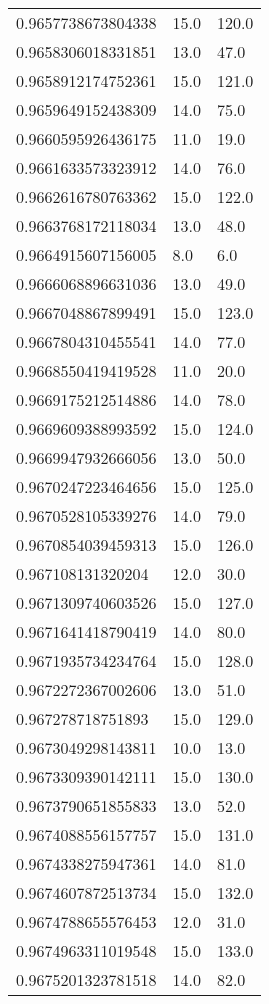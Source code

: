 \begin{center}
\begin{supertabular}[H]{p{0.30\textwidth}p{0.05\textwidth}p{0.05\textwidth}}
0.9657738673804338 & 15.0 & 120.0 \\ 
0.9658306018331851 & 13.0 & 47.0 \\ 
0.9658912174752361 & 15.0 & 121.0 \\ 
0.9659649152438309 & 14.0 & 75.0 \\ 
0.9660595926436175 & 11.0 & 19.0 \\ 
0.9661633573323912 & 14.0 & 76.0 \\ 
0.9662616780763362 & 15.0 & 122.0 \\ 
0.9663768172118034 & 13.0 & 48.0 \\ 
0.9664915607156005 & 8.0 & 6.0 \\ 
0.9666068896631036 & 13.0 & 49.0 \\ 
0.9667048867899491 & 15.0 & 123.0 \\ 
0.9667804310455541 & 14.0 & 77.0 \\ 
0.9668550419419528 & 11.0 & 20.0 \\ 
0.9669175212514886 & 14.0 & 78.0 \\ 
0.9669609388993592 & 15.0 & 124.0 \\ 
0.9669947932666056 & 13.0 & 50.0 \\ 
0.9670247223464656 & 15.0 & 125.0 \\ 
0.9670528105339276 & 14.0 & 79.0 \\ 
0.9670854039459313 & 15.0 & 126.0 \\ 
0.967108131320204 & 12.0 & 30.0 \\ 
0.9671309740603526 & 15.0 & 127.0 \\ 
0.9671641418790419 & 14.0 & 80.0 \\ 
0.9671935734234764 & 15.0 & 128.0 \\ 
0.9672272367002606 & 13.0 & 51.0 \\ 
0.967278718751893 & 15.0 & 129.0 \\ 
0.9673049298143811 & 10.0 & 13.0 \\ 
0.9673309390142111 & 15.0 & 130.0 \\ 
0.9673790651855833 & 13.0 & 52.0 \\ 
0.9674088556157757 & 15.0 & 131.0 \\ 
0.9674338275947361 & 14.0 & 81.0 \\ 
0.9674607872513734 & 15.0 & 132.0 \\ 
0.9674788655576453 & 12.0 & 31.0 \\ 
0.9674963311019548 & 15.0 & 133.0 \\ 
0.9675201323781518 & 14.0 & 82.0 \\ 

\end{supertabular}
\end{center}
